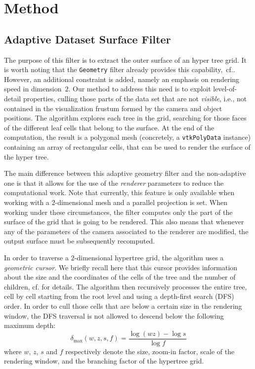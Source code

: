 \section{Method}
\label{s:method}
\subsection{Adaptive Dataset Surface Filter}
\label{s:adaptive-surface-filter}
The purpose of this filter is to extract the outer surface of an
hyper tree grid. 
It is worth noting that the \texttt{Geometry} filter already provides
this capability,~cf.\cite{harel:17}.
However, an additional constraint is added, namely an emphasis on
rendering speed in dimension~$2$.
Our method to address this need is to exploit level-of-detail
properties, culling those parts of the data set that are not
\emph{visible}, i.e., not contained in the visualization frustum
formed by the camera and object positions.
The algorithm explores each tree in the grid, searching for those
faces of the different leaf cells that belong to the surface.
At the end of the computation, the result is a polygonal mesh
(concretely, a \texttt{vtkPolyData} instance) containing an array of
rectangular cells, that can be used to render the surface of the hyper
tree.

The main difference between this adaptive geometry filter and the
non-adaptive one is that it allows for the use of the \emph{renderer}
parameters to reduce the computational work.
Note that currently, this feature is only available when working with
a $2$-dimensional mesh and a parallel projection is set.
When working under these circumstances, the filter computes only the
part of the surface of the grid that is going to be rendered.
This also means that whenever any of the parameters of the
camera associated to the renderer are modified, the output surface
must be subsequently recomputed.

In order to traverse a $2$-dimensional hypertree grid, the algorithm
uses a \emph{geometric cursor}.
We briefly recall here that this cursor provides information about the
size and the coordinates of the cells of the tree and the number of
children, cf.\cite{harel:17} for details.
The algorithm then recursively processes the entire tree, cell by cell
starting from the root level and using a depth-first search (DFS)
order.
In order to cull those cells that are below a certain size in the
rendering window, the DFS traversal is not allowed to descend below
the following maximum depth:
\begin{equation}
\label{eq:level-max}
\delta_{\max}(w,z,s,f) = \frac{\log(wz) - \log{s}}{\log{f}}
\end{equation}
where $w$, $z$, $s$ and $f$ respectively denote the size,
zoom-in factor, scale of the rendering window, and the branching
factor of the hypertree grid.


